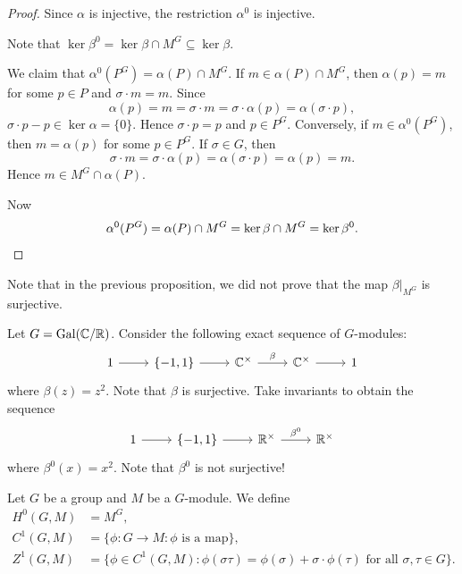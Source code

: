 \begin{proof}
    Since $\alpha$ is injective, the restriction $\alpha^0$ is injective. 

    Note that 
    $\ker\beta^0=\ker\beta\cap M^G\subseteq\ker\beta$. 
    
    We claim 
    that $\alpha^0(P^G)=\alpha(P)\cap M^G$. If $m\in\alpha(P)\cap M^G$, then 
    $\alpha(p)=m$ for some $p\in P$ and $\sigma\cdot m=m$. Since
    \[
    \alpha(p)=m=\sigma\cdot m=\sigma\cdot\alpha(p)=\alpha(\sigma\cdot p),
    \]
    $\sigma\cdot p-p\in\ker\alpha=\{0\}$. Hence $\sigma\cdot p=p$ and
    $p\in P^G$. Conversely, if $m\in\alpha^0(P^G)$, then 
    $m=\alpha(p)$ for some $p\in P^G$. If $\sigma\in G$, then
    \[
    \sigma\cdot m=\sigma\cdot\alpha(p)=\alpha(\sigma\cdot p)=\alpha(p)=m.
    \]
    Hence $m\in M^G\cap\alpha(P)$.

    Now
    \[
    \alpha^0(P^G)=\alpha(P)\cap M^G=\ker\beta\cap M^G=\ker\beta^0.\qedhere  
    \]
\end{proof}

Note that in the previous proposition, we did not prove that
the map $\beta|_{M^G}$ is surjective. 

\begin{example}
    Let $G=\operatorname{Gal}(\mathbb{C}/\mathbb{R})$. Consider the following exact sequence
    of $G$-modules:
    \[
    \begin{tikzcd}
    1 & \{-1,1\} & \C^\times & \C^\times & 1
    \arrow[from=1-1, to=1-2]
    \arrow[from=1-2, to=1-3]
    \arrow["\beta", from=1-3, to=1-4]
    \arrow[from=1-4, to=1-5]
    \end{tikzcd}    
    \]
    where $\beta(z)=z^2$. Note that $\beta$ is surjective. Take invariants 
    to obtain the sequence  
    \[
    \begin{tikzcd}
     1 & \{-1,1\} & \R^\times & \R^\times 
     \arrow[from=1-1, to=1-2]
     \arrow[from=1-2, to=1-3]
     \arrow["\beta^0", from=1-3, to=1-4]
     \end{tikzcd}
     \]
     where $\beta^0(x)=x^2$. Note that $\beta^0$ is not surjective! 
\end{example}

\begin{definition}
    Let $G$ be a group and $M$ be a $G$-module. 
    We define 
    \begin{align*}
        H^0(G,M)&=M^G,\\
        C^1(G,M)&=\{\phi\colon G\to M:\phi\text{ is a map}\},\\
        Z^1(G,M)&=\{\phi\in C^1(G,M):\phi(\sigma\tau)=\phi(\sigma)+\sigma\cdot\phi(\tau)\text{ for all $\sigma,\tau\in G$}\}.
        \end{align*}    
\end{definition}


